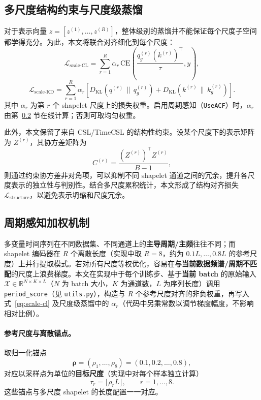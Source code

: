 \documentclass{article}
\begin{document}
\subsection{多尺度结构约束与尺度级蒸馏}

对于表示向量 $z=[z^{(1)},\dots,z^{(R)}]$，整体级别的蒸馏并不能保证每个尺度子空间都学得充分。为此，本文将联合对齐细化到每个尺度：
\begin{equation}
\mathcal{L}_{\text{scale-CL}} = \sum_{r=1}^{R}\alpha_r \,
\mathrm{CE}\left(\frac{q_g^{(r)}(k^{(r)})^\top}{\tau}, y\right),
\label{eq:scale-cl}
\end{equation}
\begin{equation}
\mathcal{L}_{\text{scale-KD}} = \sum_{r=1}^{R}\alpha_r \left[
D_{\mathrm{KL}}\left(q^{(r)} \,\|\, q_g^{(r)}\right)+
D_{\mathrm{KL}}\left(k^{(r)} \,\|\, k_g^{(r)}\right)\right].
\end{equation}
其中 $\alpha_r$ 为第 $r$ 个 shapelet 尺度上的损失权重。启用周期感知（\texttt{UseACF}）时，$\alpha_r$ 由第~\ref{sec:period-score} 节在线计算；否则可取均匀权重。

此外，本文保留了来自 CSL/TimeCSL 的结构性约束。设某个尺度下的表示矩阵为 $Z^{(r)}$，其协方差矩阵为
\begin{equation}
C^{(r)} = \frac{\left(Z^{(r)}\right)^\top Z^{(r)}}{B-1},
\end{equation}
则通过约束协方差非对角项，可以抑制不同 shapelet 通道之间的冗余，提升各尺度表示的独立性与判别性。结合多尺度累积统计，本文形成了结构对齐损失 $\mathcal{L}_{\text{structure}}$，以避免表示坍缩和尺度冗余。

\subsection{周期感知加权机制}
\label{sec:period-score}

多变量时间序列在不同数据集、不同通道上的\textbf{主导周期/主频}往往不同；而 shapelet 编码器在 $R$ 个离散长度（实现中取 $R{=}8$，约为 $0.1L,\ldots,0.8L$ 的参考尺度）上并行提取模式。若对所有尺度等权优化，容易在\textbf{与当前数据频谱/周期不匹配}的尺度上浪费梯度。本文在实现中于每个训练步、基于\textbf{当前 batch} 的原始输入 $\mathcal{X}\in\mathbb{R}^{N\times K\times L}$（$N$ 为 batch 大小，$K$ 为通道数，$L$ 为序列长度）调用 \texttt{period\_score}（见 \texttt{utils.py}），构造与 $R$ 个参考尺度对齐的非负权重，再写入式~\eqref{eq:scale-cl} 及尺度级蒸馏中的 $\alpha_r$（代码中另乘常数以调节梯度幅度，不影响相对比例）。

\paragraph{参考尺度与离散锚点。}
取归一化锚点
\begin{equation}
\bm{\rho}=(\rho_1,\ldots,\rho_8)=(0.1,0.2,\ldots,0.8),
\end{equation}
对应以采样点为单位的\textbf{目标尺度}（实现中对每个样本独立计算）
\begin{equation}
\tau_r=\bigl\lfloor \rho_r L \bigr\rfloor,\qquad r=1,\ldots,8.
\end{equation}
这些锚点与多尺度 shapelet 的长度配置一一对应。
\end{document}
